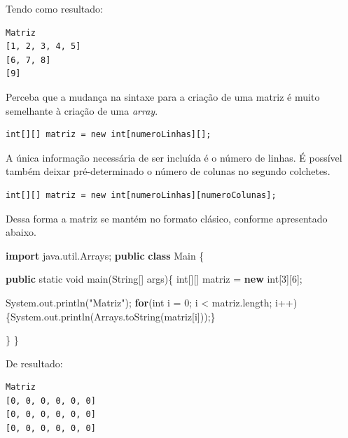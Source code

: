 \documentclass[
]{book}
\newenvironment{Shaded}{\begin{snugshade}}{\end{snugshade}}
\newcommand{\BuiltInTok}[1]{#1}
\newcommand{\DataTypeTok}[1]{\textcolor[rgb]{0.13,0.29,0.53}{#1}}
\newcommand{\DecValTok}[1]{\textcolor[rgb]{0.00,0.00,0.81}{#1}}
\newcommand{\FunctionTok}[1]{\textcolor[rgb]{0.00,0.00,0.00}{#1}}
\newcommand{\ImportTok}[1]{#1}
\newcommand{\KeywordTok}[1]{\textcolor[rgb]{0.13,0.29,0.53}{\textbf{#1}}}
\newcommand{\NormalTok}[1]{#1}
\newcommand{\StringTok}[1]{\textcolor[rgb]{0.31,0.60,0.02}{#1}}
\begin{document}
Tendo como resultado:

\begin{verbatim}
Matriz
[1, 2, 3, 4, 5]
[6, 7, 8]
[9]
\end{verbatim}

Perceba que a mudança na sintaxe para a criação de uma matriz é muito semelhante à criação de uma \emph{array}.

\begin{verbatim}
int[][] matriz = new int[numeroLinhas][];
\end{verbatim}

A única informação necessária de ser incluída é o número de linhas. É possível também deixar pré-determinado o número de colunas no segundo colchetes.

\begin{verbatim}
int[][] matriz = new int[numeroLinhas][numeroColunas];
\end{verbatim}

Dessa forma a matriz se mantém no formato clásico, conforme apresentado abaixo.

\begin{Shaded}
\begin{Highlighting}[]
\KeywordTok{import}\ImportTok{ java.util.Arrays;}
\KeywordTok{public} \KeywordTok{class}\NormalTok{ Main \{}

    \KeywordTok{public} \DataTypeTok{static} \DataTypeTok{void} \FunctionTok{main}\NormalTok{(}\BuiltInTok{String}\NormalTok{[] args)\{}
        \DataTypeTok{int}\NormalTok{[][] matriz = }\KeywordTok{new} \DataTypeTok{int}\NormalTok{[}\DecValTok{3}\NormalTok{][}\DecValTok{6}\NormalTok{];}

        \BuiltInTok{System}\NormalTok{.}\FunctionTok{out}\NormalTok{.}\FunctionTok{println}\NormalTok{(}\StringTok{"Matriz"}\NormalTok{);}
        \KeywordTok{for}\NormalTok{(}\DataTypeTok{int}\NormalTok{ i = }\DecValTok{0}\NormalTok{; i < matriz.}\FunctionTok{length}\NormalTok{; i++) \{}\BuiltInTok{System}\NormalTok{.}\FunctionTok{out}\NormalTok{.}\FunctionTok{println}\NormalTok{(}\BuiltInTok{Arrays}\NormalTok{.}\FunctionTok{toString}\NormalTok{(matriz[i]));\}}

\NormalTok{    \}}
\NormalTok{\}}
\end{Highlighting}
\end{Shaded}

De resultado:

\begin{verbatim}
Matriz
[0, 0, 0, 0, 0, 0]
[0, 0, 0, 0, 0, 0]
[0, 0, 0, 0, 0, 0]
\end{verbatim}
\end{document}

